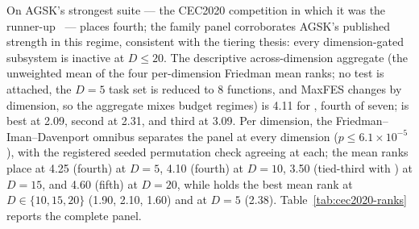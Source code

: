 On AGSK's strongest suite --- the CEC2020 competition in which it was
the runner-up~\cite{apgsk2021} --- \dtgsk{} places fourth; the family
panel corroborates AGSK's published strength in this regime, consistent
with the tiering thesis: every dimension-gated \dtgsk{} subsystem is
inactive at $D \leq 20$.
The descriptive across-dimension aggregate (the unweighted mean of the
four per-dimension Friedman mean ranks; no test is attached, the $D = 5$
task set is reduced to 8 functions, and MaxFES changes by dimension, so
the aggregate mixes budget regimes) is 4.11 for \dtgsk{}, fourth of
seven; \agsk{} is best at 2.09, \fdbagsk{} second at 2.31, and \apgsk{}
third at 3.09.
Per dimension, the Friedman--Iman--Davenport omnibus separates the panel
at every dimension ($p \leq 6.1 \times 10^{-5}$), with the registered
seeded permutation check agreeing at each; the mean ranks place \dtgsk{}
at 4.25 (fourth) at $D = 5$, 4.10 (fourth) at $D = 10$, 3.50 (tied-third
with \apgsk{}) at $D = 15$, and 4.60 (fifth) at $D = 20$, while \agsk{}
holds the best mean rank at $D \in \{10, 15, 20\}$ (1.90, 2.10, 1.60)
and \apgsk{} at $D = 5$ (2.38).
Table~\ref{tab:cec2020-ranks} reports the complete panel.

